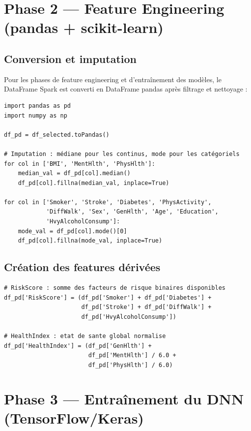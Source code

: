 \section{Phase 2 --- Feature Engineering (pandas + scikit-learn)}

\subsection{Conversion et imputation}

Pour les phases de feature engineering et d'entraînement des modèles, le DataFrame Spark est converti en DataFrame pandas après filtrage et nettoyage :

\begin{lstlisting}[caption=Imputation des valeurs manquantes, label=lst:imputation]
import pandas as pd
import numpy as np

df_pd = df_selected.toPandas()

# Imputation : médiane pour les continus, mode pour les catégoriels
for col in ['BMI', 'MentHlth', 'PhysHlth']:
    median_val = df_pd[col].median()
    df_pd[col].fillna(median_val, inplace=True)

for col in ['Smoker', 'Stroke', 'Diabetes', 'PhysActivity',
            'DiffWalk', 'Sex', 'GenHlth', 'Age', 'Education',
            'HvyAlcoholConsump']:
    mode_val = df_pd[col].mode()[0]
    df_pd[col].fillna(mode_val, inplace=True)
\end{lstlisting}

\subsection{Création des features dérivées}

\begin{lstlisting}[caption=Features dérivées RiskScore et HealthIndex, label=lst:derived]
# RiskScore : somme des facteurs de risque binaires disponibles
df_pd['RiskScore'] = (df_pd['Smoker'] + df_pd['Diabetes'] +
                      df_pd['Stroke'] + df_pd['DiffWalk'] +
                      df_pd['HvyAlcoholConsump'])

# HealthIndex : etat de sante global normalise
df_pd['HealthIndex'] = (df_pd['GenHlth'] +
                        df_pd['MentHlth'] / 6.0 +
                        df_pd['PhysHlth'] / 6.0)
\end{lstlisting}

\section{Phase 3 --- Entraînement du DNN (TensorFlow/Keras)}

